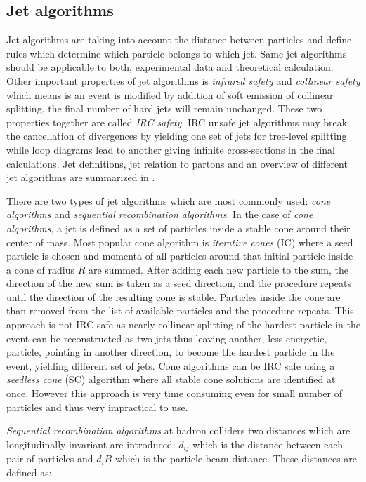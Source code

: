 
\subsection{Jet algorithms}

Jet algorithms are taking into account the distance between particles and define rules which determine which particle belongs to which jet. Same jet algorithms should be applicable to both, experimental data and theoretical calculation.  Other important properties of jet algorithms is \textit{infrared safety} and \textit{collinear safety} which means is an event is modified by addition of soft emission of collinear splitting, the final number of hard jets will remain unchanged. These two properties together are called \textit{IRC safety}. IRC unsafe jet algorithms may break the cancellation of divergences by yielding one set of jets for tree-level splitting while loop diagrams lead to another giving infinite cross-sections in the final calculations. Jet definitions, jet relation to partons and an overview of different jet algorithms are summarized in \cite{Salam:2009jx}.
\par There are two types of jet algorithms which are most commonly used: \textit{cone algorithms} and \textit{sequential recombination algorithms}. In the case of \textit{cone algorithms}, a jet is defined as a set of particles inside a stable cone around their center of mass. Most popular cone algorithm is \textit{iterative cones} (IC) where a seed particle is chosen and momenta of all particles around that initial particle inside a cone of radius $R$ are summed. After adding each new particle to the sum, the direction of the new sum is taken as a seed direction, and the procedure repeats until the direction of the resulting cone is stable. Particles inside the cone are than removed from the list of available particles and the procedure repeats. This approach is not IRC safe as nearly collinear splitting of the hardest particle in the event can be reconstructed as two jets thus leaving another, less energetic, particle, pointing in another direction, to become the hardest particle in the event, yielding different set of jets. Cone algorithms can be IRC safe using a \textit{seedless cone} (SC) algorithm where all stable cone solutions are identified at once. However this approach is very time consuming even for small number of particles and thus very impractical to use.
\par \textit{Sequential recombination algorithms} at hadron colliders two distances which are longitudinally invariant are introduced: $d_{ij}$ which is the distance between each pair of particles and $d_iB$ which is the particle-beam distance. These distances are defined as: 
